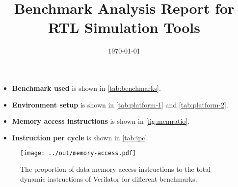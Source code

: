 \documentclass{article}
\title{Benchmark Analysis Report for RTL Simulation Tools}
\date{\today}
\author{}
\begin{document}
\maketitle

\begin{itemize}[noitemsep,topsep=0pt]
  \item {\bf Benchmark used} is shown in \autoref{tab:benchmarks}.
  \item {\bf Environment setup} is shown in \autoref{tab:platform-1} and \autoref{tab:platform-2}.
  \item {\bf Memory access instructions } is shown in \autoref{fig:memratio}.
  \item {\bf Instruction per cycle} is shown in \autoref{tab:ipc}.
\end{itemize}




\centering


\newpage

\begin{figure}[h!]
  \centering
  \texttt{[image: ../out/memory-access.pdf]}
  \vspace*{-4mm}
  \caption{The proportion of data memory access instructions to the total dynamic instructions of Verilator for different benchmarks.}
  \label{fig:memratio}
\end{figure}


\end{document}
